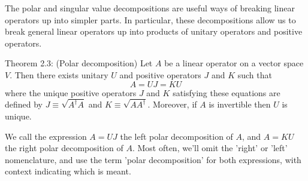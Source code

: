 The polar and singular value decompositions are useful ways of breaking linear operators up into simpler parts. In particular, these decompositions allow us to break general linear operators up into products of unitary operators and positive operators. 


\begin{theorem}
Theorem 2.3: (Polar decomposition) Let $A$ be a linear operator on a vector space $V$. Then there exists unitary $U$ and positive operators $J$ and $K$ such that
$$
A=U J=K U
$$
where the unique positive operators $J$ and $K$ satisfying these equations are defined by $J \equiv \sqrt{A^{\dagger} A}$ and $K \equiv \sqrt{A A^{\dagger}}$. Moreover, if $A$ is invertible then $U$ is unique.
\end{theorem}

We call the expression $A=U J$ the left polar decomposition of $A$, and $A=K U$ the right polar decomposition of $A$. Most often, we'll omit the 'right' or 'left' nomenclature, and use the term 'polar decomposition' for both expressions, with context indicating which is meant.

